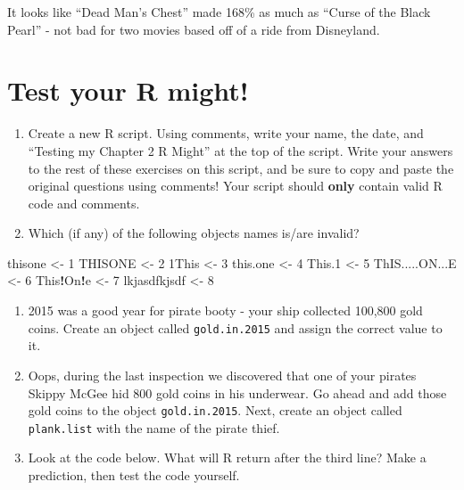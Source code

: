 \documentclass[]{book}
\newenvironment{Shaded}{\begin{snugshade}}{\end{snugshade}}
\newcommand{\DecValTok}[1]{\textcolor[rgb]{0.00,0.00,0.81}{#1}}
\newcommand{\StringTok}[1]{\textcolor[rgb]{0.31,0.60,0.02}{#1}}
\newcommand{\OperatorTok}[1]{\textcolor[rgb]{0.81,0.36,0.00}{\textbf{#1}}}
\newcommand{\NormalTok}[1]{#1}
\theoremstyle{definition}
\theoremstyle{definition}
\theoremstyle{remark}
\begin{document}
It looks like ``Dead Man's Chest'' made 168\% as much as ``Curse of the
Black Pearl'' - not bad for two movies based off of a ride from
Disneyland.

\section{Test your R might!}\label{test-your-r-might}

\begin{enumerate}
\def\labelenumi{\arabic{enumi}.}
\item
  Create a new R script. Using comments, write your name, the date, and
  ``Testing my Chapter 2 R Might'' at the top of the script. Write your
  answers to the rest of these exercises on this script, and be sure to
  copy and paste the original questions using comments! Your script
  should \textbf{only} contain valid R code and comments.
\item
  Which (if any) of the following objects names is/are invalid?
\end{enumerate}

\begin{Shaded}
\begin{Highlighting}[]
\NormalTok{thisone <-}\StringTok{ }\DecValTok{1}
\NormalTok{THISONE <-}\StringTok{ }\DecValTok{2}
\NormalTok{1This <-}\StringTok{ }\DecValTok{3}
\NormalTok{this.one <-}\StringTok{ }\DecValTok{4}
\NormalTok{This.}\DecValTok{1}\NormalTok{ <-}\StringTok{ }\DecValTok{5}
\NormalTok{ThIS.....ON...E <-}\StringTok{ }\DecValTok{6}
\NormalTok{This}\OperatorTok{!}\NormalTok{On}\OperatorTok{!}\NormalTok{e <-}\StringTok{ }\DecValTok{7}
\NormalTok{lkjasdfkjsdf <-}\StringTok{ }\DecValTok{8}
\end{Highlighting}
\end{Shaded}

\begin{enumerate}
\def\labelenumi{\arabic{enumi}.}
\setcounter{enumi}{2}
\item
  2015 was a good year for pirate booty - your ship collected 100,800
  gold coins. Create an object called \texttt{gold.in.2015} and assign
  the correct value to it.
\item
  Oops, during the last inspection we discovered that one of your
  pirates Skippy McGee hid 800 gold coins in his underwear. Go ahead and
  add those gold coins to the object \texttt{gold.in.2015}. Next, create
  an object called \texttt{plank.list} with the name of the pirate
  thief.
\item
  Look at the code below. What will R return after the third line? Make
  a prediction, then test the code yourself.
\end{enumerate}
\end{document}
